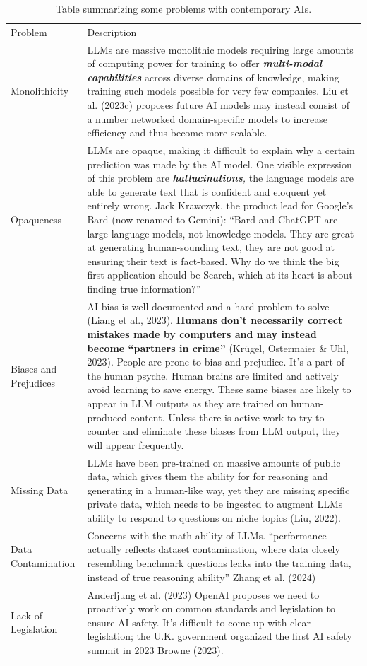 \documentclass[
  letterpaper,
  DIV=11,
  numbers=noendperiod]{scrartcl}
\begin{document}
\begin{longtable}[]{@{}
  >{\raggedright\arraybackslash}p{}
  >{\raggedright\arraybackslash}p{}@{}}
\caption{Table summarizing some problems with contemporary
AIs.}\tabularnewline
\toprule\noalign{}
\endfirsthead
\endhead
\bottomrule\noalign{}
\endlastfoot
Problem & Description \\
Monolithicity & LLMs are massive monolithic models requiring large
amounts of computing power for training to offer
\textbf{\emph{multi-modal}} \textbf{\emph{capabilities}} across diverse
domains of knowledge, making training such models possible for very few
companies. Liu et al. (2023c) proposes future AI models may instead
consist of a number networked domain-specific models to increase
efficiency and thus become more scalable. \\
Opaqueness & LLMs are opaque, making it difficult to explain why a
certain prediction was made by the AI model. One visible expression of
this problem are \emph{\textbf{hallucinations},} the language models are
able to generate text that is confident and eloquent yet entirely wrong.
Jack Krawczyk, the product lead for Google's Bard (now renamed to
Gemini): ``Bard and ChatGPT are large language models, not knowledge
models. They are great at generating human-sounding text, they are not
good at ensuring their text is fact-based. Why do we think the big first
application should be Search, which at its heart is about finding true
information?'' \\
Biases and Prejudices & AI bias is well-documented and a hard problem to
solve (Liang et al., 2023). \textbf{Humans don't necessarily correct
mistakes made by computers and may instead become ``partners in crime''}
(Krügel, Ostermaier \& Uhl, 2023). People are prone to bias and
prejudice. It's a part of the human psyche. Human brains are limited and
actively avoid learning to save energy. These same biases are likely to
appear in LLM outputs as they are trained on human-produced content.
Unless there is active work to try to counter and eliminate these biases
from LLM output, they will appear frequently. \\
Missing Data & LLMs have been pre-trained on massive amounts of public
data, which gives them the ability for for reasoning and generating in a
human-like way, yet they are missing specific private data, which needs
to be ingested to augment LLMs ability to respond to questions on niche
topics (Liu, 2022). \\
Data Contamination & Concerns with the math ability of LLMs.
``performance actually reflects dataset contamination, where data
closely resembling benchmark questions leaks into the training data,
instead of true reasoning ability'' Zhang et al. (2024) \\
Lack of Legislation & Anderljung et al. (2023) OpenAI proposes we need
to proactively work on common standards and legislation to ensure AI
safety. It's difficult to come up with clear legislation; the U.K.
government organized the first AI safety summit in 2023 Browne
(2023). \\
\end{longtable}
\end{document}
